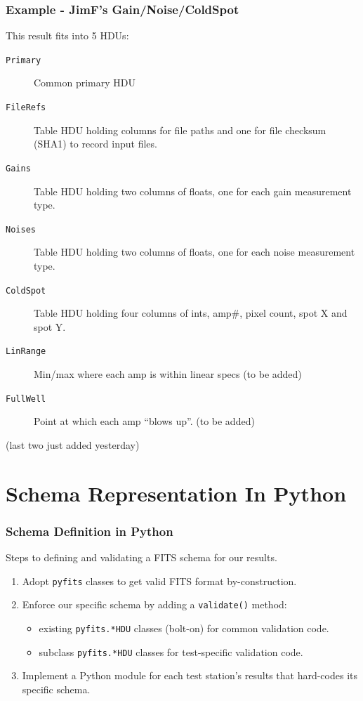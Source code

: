 \documentclass[xcolor=dvipsnames]{beamer}
\begin{document}
\begin{frame}
  \frametitle{Example - JimF's Gain/Noise/ColdSpot}
  This result fits into 5 HDUs:
  \begin{description}
  \item[\texttt{Primary}] Common primary HDU
  \item[\texttt{FileRefs}] Table HDU holding columns for file paths and
    one for file checksum (SHA1) to record input files.
  \item[\texttt{Gains}] Table HDU holding two columns of floats, one
    for each gain measurement type.
  \item[\texttt{Noises}] Table HDU holding two columns of floats, one
    for each noise measurement type.
  \item[\texttt{ColdSpot}] Table HDU holding four columns of ints,
    amp\#, pixel count, spot X and spot Y.
  \item[\texttt{LinRange}] Min/max where each amp is within linear
    specs (to be added)
  \item[\texttt{FullWell}] Point at which each amp ``blows up''. (to
    be added)
  \end{description}

  \vspace{5mm}

  \tiny
  (last two just added yesterday)

\end{frame}


\section{Schema Representation In Python}

\begin{frame}
  \frametitle{Schema Definition in Python}

  Steps to defining and validating a FITS schema for our results.

  \vspace{5mm}

  \begin{enumerate}
  \item Adopt \texttt{pyfits} classes to get valid FITS format by-construction.
  \item Enforce our specific schema by adding a \texttt{validate()} method:
    \begin{itemize}
    \item existing \texttt{pyfits.*HDU} classes (bolt-on) for common
      validation code.
    \item subclass \texttt{pyfits.*HDU} classes for test-specific
      validation code.
    \end{itemize}
  \item Implement a Python module for each test station's results that
    hard-codes its specific schema.
  \end{enumerate}

\end{frame}
\end{document}
